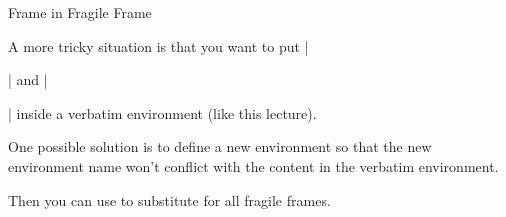 \begin{fragileframe}{Frame in Fragile Frame}

A more tricky situation is that you want to put \LC|\begin{frame}| and \LC|\end{frame}| inside a verbatim environment (like this lecture). \medskip

One possible solution is to define a new environment so that the new environment name won't conflict with the content in the verbatim environment.

\begin{example}
\begin{LCL}
\newenvironment{fragileframe}%
{\begin{frame}[fragile,environment=fragileframe]}%
{\end{frame}}
\end{LCL}
\end{example}

Then you can use \LC{\begin{fragileframe}} to substitute \LC{\begin{frame}[fragile]} for all fragile frames.

\end{fragileframe}





